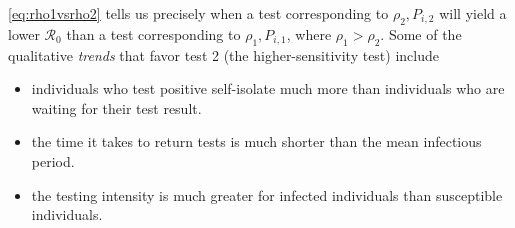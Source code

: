 \documentclass[12pt]{article}
\newcommand{\Rnum}{\ensuremath{\mathcal{R}_0}}
\DeclareRobustCommand\_{\ifmmode\expandafter\subtxt\else\textunderscore\fi}
\theoremstyle{definition} %
\begin{document}
\cref{eq:rho1vsrho2} tells us precisely when a test corresponding to $\rho_2, P_{i,2}$ will yield a lower $\Rnum$ than a test corresponding to $\rho_1, P_{i,1}$, where $\rho_1 > \rho_2$. Some of the qualitative \textit{trends} that favor test 2 (the higher-sensitivity test) include

\begin{itemize}
    \item individuals who test positive self-isolate much more than individuals who are waiting for their test result.
    \item the time it takes to return tests is much shorter than the mean infectious period.
    \item the testing intensity is much greater for infected individuals than susceptible individuals.
\end{itemize}
\end{document}
